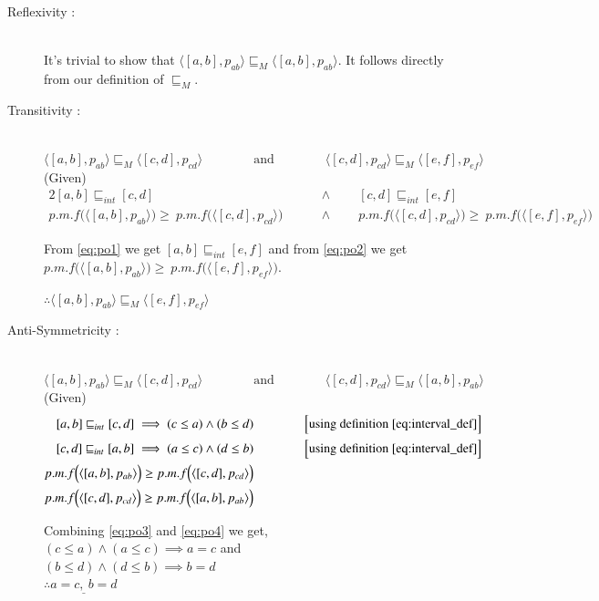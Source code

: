 \documentclass[final,3p, review, times]{util/elsarticle}
\begin{document}
\begin{description}
\item[Reflexivity :] \hfill \\
	It's trivial to show that $\langle[a,b],p_{ab}\rangle\sqsubseteq_M\langle[a,b],p_{ab}\rangle$. It follows directly from our definition of $\sqsubseteq_M$.
\item[Transitivity :] \hfill \\
	$\langle[a,b],p_{ab}\rangle\sqsubseteq_M\langle[c,d],p_{cd}\rangle\qquad\qquad\mathrm{and}\qquad\qquad\langle[c,d],p_{cd}\rangle\sqsubseteq_M\langle[e,f],p_{ef}\rangle\qquad\qquad$ (Given)	
\begin{alignat}{2}
    [a,b]\sqsubseteq_{int}[c,d] &\qquad\land\qquad[c,d]\sqsubseteq_{int}[e,f]\label{eq:po1}\\
	p.m.f\Big(\langle[a,b],p_{ab}\rangle\Big)\geq\ p.m.f\Big(\langle[c,d],p_{cd}\rangle\Big) &\qquad\land\qquad p.m.f\Big(\langle[c,d],p_{cd}\rangle\Big)\geq\ p.m.f\Big(\langle[e,f],p_{ef}\rangle\Big)\label{eq:po2}
\end{alignat}
	
	From \ref{eq:po1} we get $[a,b]\sqsubseteq_{int}[e,f]$ and from \ref{eq:po2} we get $p.m.f\Big(\langle[a,b],p_{ab}\rangle\Big)\geq\ p.m.f\Big(\langle[e,f],p_{ef}\rangle\Big)$.
	
	$\therefore\langle[a,b],p_{ab}\rangle\sqsubseteq_M\langle[e,f],p_{ef}\rangle$
\item[Anti-Symmetricity :] \hfill \\
	$\langle[a,b],p_{ab}\rangle\sqsubseteq_M\langle[c,d],p_{cd}\rangle\qquad\qquad\mathrm{and}\qquad\qquad\langle[c,d],p_{cd}\rangle\sqsubseteq_M\langle[a,b],p_{ab}\rangle\qquad\qquad$ (Given)
\begin{alignat}{2}
    [a,b]\sqsubseteq_{int}[c,d]\implies (c\leq a)\land (b\leq d)&\qquad\qquad\Big[\mathrm{using\ definition}\ \ref{eq:interval_def}\Big]\label{eq:po3}\\
	[c,d]\sqsubseteq_{int}[a,b]\implies (a\leq c)\land (d\leq b)&\qquad\qquad\Big[\mathrm{using\ definition}\ \ref{eq:interval_def}\Big]\label{eq:po4}\\
	p.m.f\Big(\langle[a,b],p_{ab}\rangle\Big)\geq p.m.f\Big(\langle[c,d],p_{cd}\rangle\Big)&\label{eq:po5}\\
	p.m.f\Big(\langle[c,d],p_{cd}\rangle\Big)\geq p.m.f\Big(\langle[a,b],p_{ab}\rangle\Big)&\label{eq:po6}
\end{alignat}

Combining \ref{eq:po3} and \ref{eq:po4} we get,\\
	$(c\leq a)\land (a\leq c)\implies a=c$ and\\
	$(b\leq d)\land (d\leq b)\implies b=d$\\
	$\therefore \underline{a=c,\ b=d}$
	

\end{description}
\end{document}
